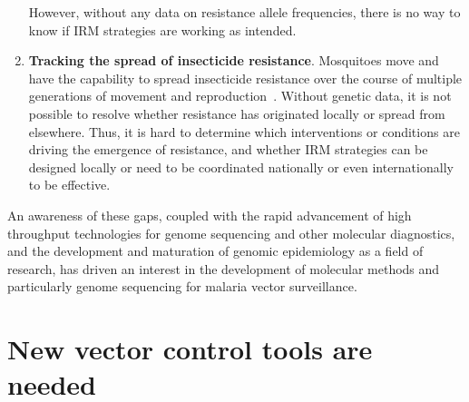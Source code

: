 \begin{refsection}
\begin{enumerate}
%
However, without any data on resistance allele frequencies, there is no way to know if IRM strategies are working as intended.
%
\item \textbf{Tracking the spread of insecticide resistance}. 
%
Mosquitoes move and have the capability to spread insecticide resistance over the course of multiple generations of movement and reproduction~\parencite{Service1997,Huestis2019}.
%
Without genetic data, it is not possible to resolve whether resistance has originated locally or spread from elsewhere.
%
Thus, it is hard to determine which interventions or conditions are driving the emergence of resistance, and whether IRM strategies can be designed locally or need to be coordinated nationally or even internationally to be effective.
%
\end{enumerate}
%
An awareness of these gaps, coupled with the rapid advancement of high throughput technologies for genome sequencing and other molecular diagnostics, and the development and maturation of genomic epidemiology as a field of research, has driven an interest in the development of molecular methods and particularly genome sequencing for malaria vector surveillance.


\section{New vector control tools are needed}\label{sec:new-tools}


\end{refsection}
